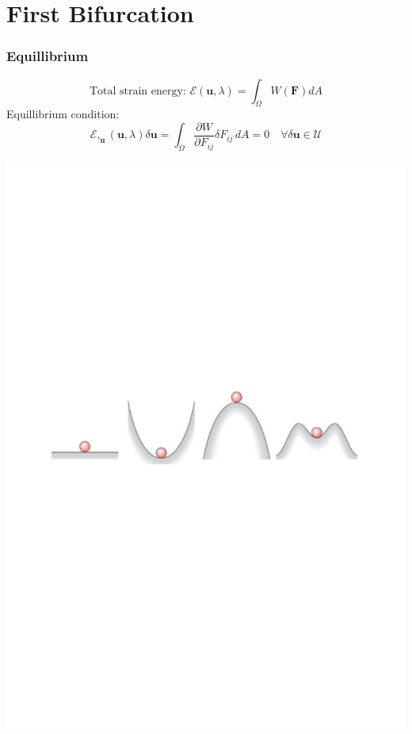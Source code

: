 \documentclass{beamer}
\begin{document}
\section{First Bifurcation}

\begin{frame}
	\frametitle{\large Equillibrium}\begin{equation*}	
	\mbox{Total strain energy: } \mathcal{E}(\mathbf{u}, \lambda) = \int_\Omega W(\mathbf{F}) dA
\end{equation*}
	Equillibrium condition:
	\footnotesize 
	\begin{equation*}
	\mathcal{E},_{\mathbf{u}}(\mathbf{u}, \lambda) \delta\mathbf{u} = \int_\Omega  \frac{\partial W}{\partial {F_{ij}}} \delta F_{ij} \,dA = 0 \quad \forall \delta\mathbf{u} \in \mathcal{U}
	\end{equation*}
	\normalsize

\includegraphics[width = \textwidth]{myFigures/stability}
	
\end{frame}
\end{document}
